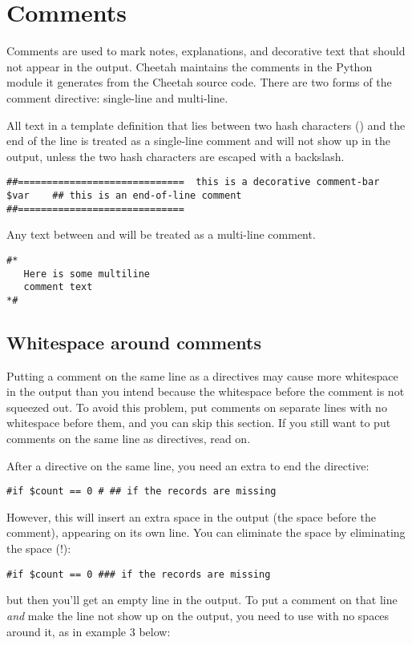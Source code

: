 \section{Comments}
\label{comments}

Comments are used to mark notes, explanations, and decorative text that should
not appear in the output.  Cheetah maintains the comments in the Python module
it generates from the Cheetah source code. There are two forms of the comment
directive: single-line and multi-line.

All text in a template definition that lies between two hash characters
(\code{\#\#}) and the end of the line is treated as a single-line comment and
will not show up in the output, unless the two hash characters are escaped with
a backslash.
\begin{verbatim}
##=============================  this is a decorative comment-bar
$var    ## this is an end-of-line comment
##=============================
\end{verbatim}

Any text between \code{\#*} and \code{*\#} will be treated as a multi-line
comment.
\begin{verbatim}
#*
   Here is some multiline
   comment text
*#
\end{verbatim}

\subsection{Whitespace around comments}
\label{comments.whitespace}

Putting a comment on the same line as a directives may cause more whitespace in
the output than you intend because the whitespace before the comment is not
squeezed out.  To avoid this problem, put comments on separate lines with no
whitespace before them, and you can skip this section.  If you still want to
put comments on the same line as directives, read on.

After a directive on the same line, you need an extra \code{\#} to end the
directive:
\begin{verbatim}
#if $count == 0 # ## if the records are missing
\end{verbatim}

However, this will insert an extra space in the output (the space before the
comment), appearing on its own line.  You can eliminate the space by eliminating
the space (!): 
\begin{verbatim}
#if $count == 0 ### if the records are missing
\end{verbatim}
but then you'll get an empty line in the output.  To put a comment on that
line {\em and} make the line not show up on the output, you need to use
 with no spaces around it, as in example 3 below:

